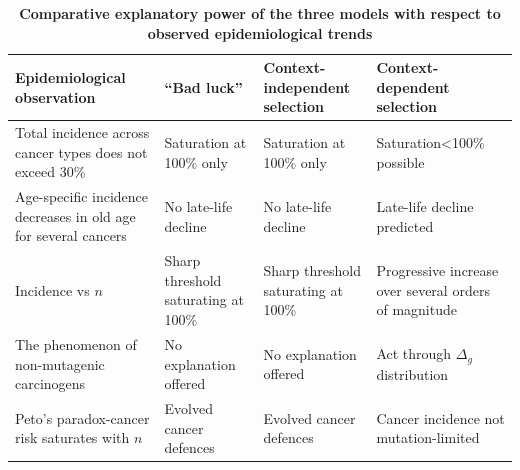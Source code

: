\documentclass[12pt,onecolumn,twoside]{article}
\begin{document}
\begin{table}[h]
	\centering
	\caption{\textbf{Comparative explanatory power of the three models with respect to observed epidemiological trends}}
	\vspace{5pt}
	\begin{tabular}{p{3.5cm}p{3.5cm}p{3.5cm}p{3.5cm}}
	Epidemiological observation & ``Bad luck'' & Context-independent selection & Context-dependent selection \\
	\hline
	Total incidence across cancer types does not exceed 30\% & Saturation at 100\% only & Saturation at 100\% only & Saturation<100\% possible \\
	Age-specific incidence decreases in old age for several cancers & No late-life decline & No late-life decline & Late-life decline predicted \\
	Incidence vs $n$ & Sharp threshold saturating at 100\% & Sharp threshold saturating at 100\% & Progressive increase over several orders of magnitude \\
	The phenomenon of non-mutagenic carcinogens & No explanation offered & No explanation offered & Act through $\Delta_{g}$ distribution \\
	Peto's paradox-cancer risk saturates with $n$ & Evolved cancer defences & Evolved cancer defences & Cancer incidence not mutation-limited \\
	\hline
	\end{tabular}
	\label{Table 1}
\end{table}
\end{document}
